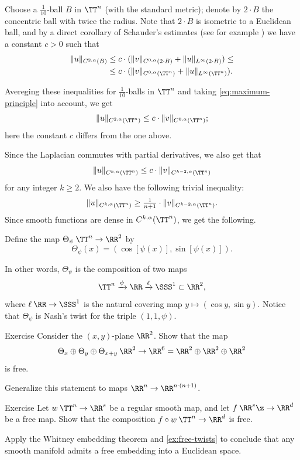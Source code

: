 Choose a $\tfrac1{10}$-ball $B$ in $\TT^n$ (with the standard metric);
denote by $2\cdot B$ the concentric ball with twice the radius.
Note that $2\cdot B$ is isometric to a Euclidean ball, and by a direct corollary of Schauder's estimates (see for example \cite[Lemma 6.1(a)]{gilbarg-trudinger}) we have a constant $c>0$ such that
\begin{align*}
\|u\|_{C^{2,\alpha}(B)}
&\le c\cdot(\|v\|_{C^{0,\alpha}(2\cdot B)} + \|u\|_{L^\infty(2\cdot B)})\le
\\
&\le c\cdot(\|v\|_{C^{0,\alpha}(\TT^n)} + \|u\|_{L^\infty(\TT^n)}).
\end{align*}

Avereging these inequalities for $\tfrac1{10}$-balls in $\TT^n$ and taking \ref{eq:maximum-principle} into account, we get
\[\|u\|_{C^{2,\alpha}(\TT^n)}\le c\cdot\|v\|_{C^{0,\alpha}(\TT^n)};\]
here the constant $c$ differs from the one above.

Since the Laplacian commutes with partial derivatives, we also get that
\[\|u\|_{C^{k,\alpha}(\TT^n)}
\le
c\cdot\|v\|_{C^{k-2,\alpha}(\TT^n)}\]
for any integer $k\ge 2$.
We also have the following trivial inequality:
\[\|u\|_{C^{k,\alpha}(\TT^n)}\ge \tfrac1{n+1}\cdot\|v\|_{C^{k-2,\alpha}(\TT^n)}.\]
Since smooth functions are dense in $C^{k,\alpha}(\TT^n)$, we get the following.













Define the map $\Theta_\psi\:\TT^n \to \RR^2$ by
\[\Theta_\psi(x)=(\cos [\psi(x)],\sin [\psi(x)]).\]

In other words, $\Theta_\psi$ is the composition of two maps
\[\TT^n\xrightarrow{\psi}\RR\xrightarrow{\ell}\SSS^1\subset\RR^2,\]
where $\ell\:\RR\to\SSS^1$ is the natural covering map $y\mapsto (\cos y,\sin y)$.
Notice that $\Theta_\psi$ is Nash's twist for the triple $(1,1,\psi)$.

\begin{thm}{Exercise}\label{ex:free-twists}
Consider the $(x,y)$-plane $\RR^2$.
Show that the map
\[\Theta_x\oplus \Theta_y\oplus \Theta_{x+y}\:\RR^2\to \RR^6=\RR^2\oplus\RR^2\oplus\RR^2\]
is free.

Generalize this statement to maps $\RR^n\to \RR^{n\cdot(n+1)}$.
\end{thm}

\begin{thm}{Exercise}\label{ex:free-composition}
Let $w\:\TT^n \to \RR^s$ be a regular smooth map, and let $f\:\RR^s\z\to \RR^d$ be a free map.
Show that the composition $f\circ w\:\TT^n \to \RR^d$ is free.

Apply the Whitney embedding theorem and \ref{ex:free-twists} to conclude that any smooth manifold admits a free embedding into a Euclidean space.
\end{thm}












